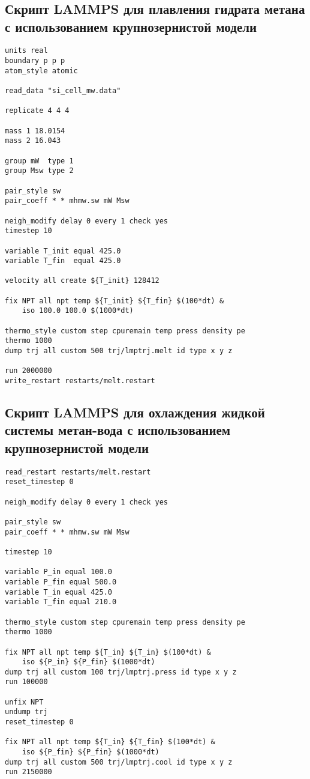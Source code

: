 \chapter{}
\section*{Скрипт LAMMPS для плавления гидрата метана с использованием крупнозернистой модели}
\begin{lstlisting}[basicstyle=\ttfamily]
units real
boundary p p p
atom_style atomic

read_data "si_cell_mw.data"

replicate 4 4 4

mass 1 18.0154
mass 2 16.043

group mW  type 1
group Msw type 2

pair_style sw
pair_coeff * * mhmw.sw mW Msw

neigh_modify delay 0 every 1 check yes
timestep 10

variable T_init equal 425.0
variable T_fin  equal 425.0

velocity all create ${T_init} 128412

fix NPT all npt temp ${T_init} ${T_fin} $(100*dt) &
    iso 100.0 100.0 $(1000*dt)

thermo_style custom step cpuremain temp press density pe
thermo 1000
dump trj all custom 500 trj/lmptrj.melt id type x y z

run 2000000
write_restart restarts/melt.restart

\end{lstlisting}

\section*{Скрипт LAMMPS для охлаждения жидкой системы метан-вода с использованием крупнозернистой модели}
\begin{lstlisting}[basicstyle=\ttfamily]
read_restart restarts/melt.restart
reset_timestep 0

neigh_modify delay 0 every 1 check yes

pair_style sw
pair_coeff * * mhmw.sw mW Msw

timestep 10

variable P_in equal 100.0
variable P_fin equal 500.0
variable T_in equal 425.0
variable T_fin equal 210.0

thermo_style custom step cpuremain temp press density pe
thermo 1000

fix NPT all npt temp ${T_in} ${T_in} $(100*dt) &
    iso ${P_in} ${P_fin} $(1000*dt)
dump trj all custom 100 trj/lmptrj.press id type x y z
run 100000

unfix NPT
undump trj
reset_timestep 0

fix NPT all npt temp ${T_in} ${T_fin} $(100*dt) &
    iso ${P_fin} ${P_fin} $(1000*dt)
dump trj all custom 500 trj/lmptrj.cool id type x y z
run 2150000

\end{lstlisting}

